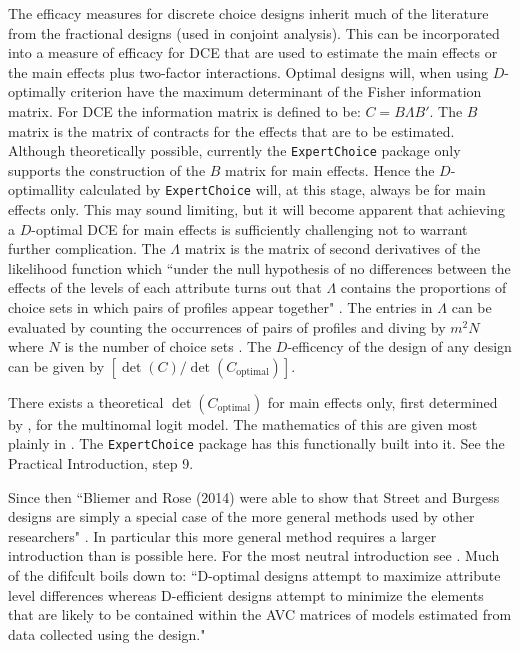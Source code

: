 \documentclass[article, crop=false]{standalone}
\begin{document}
The efficacy measures for discrete choice designs inherit much of the literature from the fractional designs (used in conjoint analysis).
This can be incorporated into a measure of efficacy for DCE that are used to estimate the main effects or the main effects plus two-factor interactions.
Optimal designs will, when using $D$-optimally criterion have the maximum determinant of the Fisher information matrix.
For DCE the information matrix is defined to be: $C = B\Lambda B'$.
The $B$ matrix is the matrix of contracts for the effects that are to be estimated.
Although theoretically possible, currently the \texttt{ExpertChoice} package only supports the construction of the $B$ matrix for main effects.
Hence the $D$-optimallity calculated by \texttt{ExpertChoice} will, at this stage, always be for main effects only.
This may sound limiting, but it will become apparent that achieving a $D$-optimal DCE for main effects is sufficiently challenging not to warrant further complication.
The $\Lambda$ matrix is the matrix of second derivatives of the likelihood function which ``under the null hypothesis of no differences between the effects of the levels of each attribute turns out that $\Lambda$ contains the proportions of choice sets in which pairs of profiles appear together" \citep[462]{street2007construction}.
The entries in $\Lambda$ can be evaluated by counting the occurrences of pairs of profiles and diving by $m^2N$ where $N$ is the number of choice sets \citep[462]{street2007construction}.
The $D$-efficency of the design of any design can be given by $[\det(C)/\det(C_{\text{optimal}})]$.

There exists a theoretical $\det(C_{\text{optimal}})$ for main effects only, first determined by \citet{burgess2005optimal}, for the multinomal logit model.
The mathematics of this are given most plainly in \citet{street2007construction}.
The \texttt{ExpertChoice} package has this functionally built into it.
See the Practical Introduction, step 9.

Since then ``Bliemer and Rose (2014) were able to show that Street and
Burgess designs are simply a special case of the more general methods used by
other researchers" \citep[310]{hensherrosegreene2015}.
In particular this more general method requires a larger introduction than is possible here.
For the most neutral introduction see \citet{walker2018d}.
Much of the dififcult boils down to:
``D-optimal designs attempt to maximize attribute level differences whereas
D-efficient designs attempt to minimize the elements that are likely to be
contained within the AVC matrices of models estimated from data collected using
the design." \citep{rose2009efficient-stated-choice}
\end{document}
